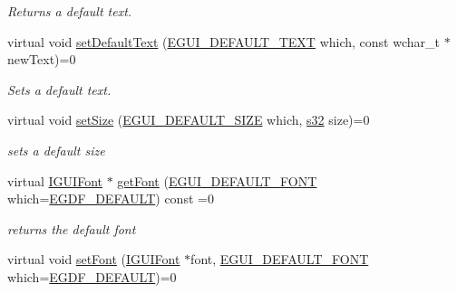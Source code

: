\begin{DoxyCompactItemize}
\begin{DoxyCompactList}\small\item\em Returns a default text. \end{DoxyCompactList}\item 
virtual void \hyperlink{classirr_1_1gui_1_1IGUISkin_a782a67363479b5cf7d085189774908ef}{set\+Default\+Text} (\hyperlink{namespaceirr_1_1gui_a18bc64c635f8b0db66498d779569e296}{E\+G\+U\+I\+\_\+\+D\+E\+F\+A\+U\+L\+T\+\_\+\+T\+E\+XT} which, const wchar\+\_\+t $\ast$new\+Text)=0
\begin{DoxyCompactList}\small\item\em Sets a default text. \end{DoxyCompactList}\item 
\mbox{\label{classirr_1_1gui_1_1IGUISkin_afed39dadcfbdc74138f60a02d7b92d2d}} 
virtual void \hyperlink{classirr_1_1gui_1_1IGUISkin_afed39dadcfbdc74138f60a02d7b92d2d}{set\+Size} (\hyperlink{namespaceirr_1_1gui_a27be6aa12d4985a5005983182fe99d56}{E\+G\+U\+I\+\_\+\+D\+E\+F\+A\+U\+L\+T\+\_\+\+S\+I\+ZE} which, \hyperlink{namespaceirr_ac66849b7a6ed16e30ebede579f9b47c6}{s32} size)=0
\begin{DoxyCompactList}\small\item\em sets a default size \end{DoxyCompactList}\item 
\mbox{\label{classirr_1_1gui_1_1IGUISkin_ab1b2623d04688c4dfe106ca407171d6e}} 
virtual \hyperlink{classirr_1_1gui_1_1IGUIFont}{I\+G\+U\+I\+Font} $\ast$ \hyperlink{classirr_1_1gui_1_1IGUISkin_ab1b2623d04688c4dfe106ca407171d6e}{get\+Font} (\hyperlink{namespaceirr_1_1gui_a9e598ab5e8644d142e55d66e8d308441}{E\+G\+U\+I\+\_\+\+D\+E\+F\+A\+U\+L\+T\+\_\+\+F\+O\+NT} which=\hyperlink{namespaceirr_1_1gui_a9e598ab5e8644d142e55d66e8d308441a48517b1e27e7cf4362c05ed8d5e639bf}{E\+G\+D\+F\+\_\+\+D\+E\+F\+A\+U\+LT}) const =0
\begin{DoxyCompactList}\small\item\em returns the default font \end{DoxyCompactList}\item 
\mbox{\label{classirr_1_1gui_1_1IGUISkin_a1e315ed3175b14294ba753911f8423eb}} 
virtual void \hyperlink{classirr_1_1gui_1_1IGUISkin_a1e315ed3175b14294ba753911f8423eb}{set\+Font} (\hyperlink{classirr_1_1gui_1_1IGUIFont}{I\+G\+U\+I\+Font} $\ast$font, \hyperlink{namespaceirr_1_1gui_a9e598ab5e8644d142e55d66e8d308441}{E\+G\+U\+I\+\_\+\+D\+E\+F\+A\+U\+L\+T\+\_\+\+F\+O\+NT} which=\hyperlink{namespaceirr_1_1gui_a9e598ab5e8644d142e55d66e8d308441a48517b1e27e7cf4362c05ed8d5e639bf}{E\+G\+D\+F\+\_\+\+D\+E\+F\+A\+U\+LT})=0

\end{DoxyCompactItemize}
